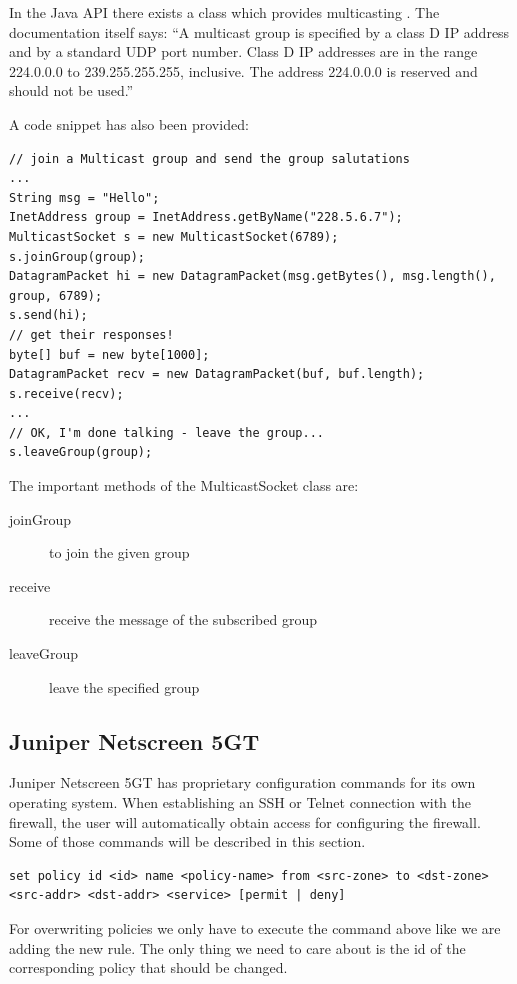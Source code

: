 \documentclass[11pt, a4paper]{article}
\begin{document}
In the Java API there exists a class which provides multicasting \cite{javamulticast}. The documentation itself says:
“A multicast group is specified by a class D IP address and by a standard UDP port number. Class D IP addresses are in the range 224.0.0.0 to 239.255.255.255, inclusive. The address 224.0.0.0 is reserved and should not be used.”

A code snippet has also been provided:

\begin{lstlisting}
// join a Multicast group and send the group salutations
...
String msg = "Hello";
InetAddress group = InetAddress.getByName("228.5.6.7");
MulticastSocket s = new MulticastSocket(6789);
s.joinGroup(group);
DatagramPacket hi = new DatagramPacket(msg.getBytes(), msg.length(),
group, 6789);
s.send(hi);
// get their responses!
byte[] buf = new byte[1000];
DatagramPacket recv = new DatagramPacket(buf, buf.length);
s.receive(recv);
...
// OK, I'm done talking - leave the group...
s.leaveGroup(group);
\end{lstlisting}

The important methods of the MulticastSocket class are:
\begin{description}
\item[joinGroup] to join the given group
\item[receive] receive the message of the subscribed group
\item[leaveGroup] leave the specified group
\end{description}

\subsection{Juniper Netscreen 5GT}

Juniper Netscreen 5GT has proprietary configuration commands for its own operating system. When establishing an SSH or Telnet connection with the firewall, the user will automatically obtain access for configuring the firewall. Some of those commands will be described in this section. 

\begin{lstlisting}
set policy id <id> name <policy-name> from <src-zone> to <dst-zone> <src-addr> <dst-addr> <service> [permit | deny]
\end{lstlisting}

For overwriting policies we only have to execute the command above like we are adding the new rule. The only thing we need to care about is the id of the corresponding policy that should be changed. 
\end{document}
